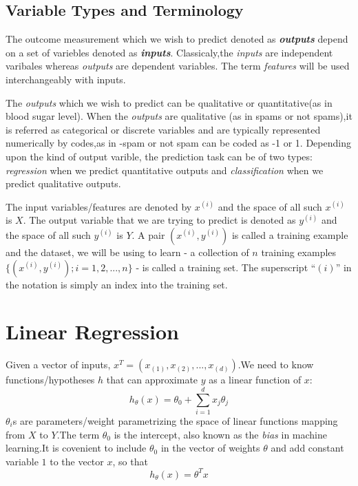 \documentclass[12pt]{article}
\begin{document}
\subsection*{Variable Types and Terminology}

The outcome measurement which we wish to predict denoted as \textbf{\textit{outputs}} depend on a set of variebles denoted as \textbf{\textit{inputs}}.
Classicaly,the \textit{inputs} are independent varibales whereas \textit{outputs} are dependent variables.
The term \textit{features} will be used interchangeably with inputs.

The \textit{outputs} which we wish to predict can be qualitative or quantitative(as in blood sugar level).
When the \textit{outputs} are qualitative (as in spams or  not spams),it is referred as categorical or discrete variables and are typically represented numerically by codes,as in -spam or not spam can be coded as -1 or 1.
Depending upon the kind of output varible, the prediction task can be of two types: \textit{regression} when we predict quantitative outputs and \textit{classification} when we predict  qualitative outputs.




 The input variables/features are denoted by $x^{(i)}$ and  the space of all such $x^{(i)}$ is $X$.
 The output variable that we are trying to predict is denoted as $y^{(i)}$ and the space of all such $y^{(i)}$ is $Y$.
 A pair $(x^{(i)},y^{(i)})$ is called a training example and the dataset, we will be using to learn - a collection of $n$ training examples $ \{(x^{(i)},y^{(i)});i=1,2,...,n\} $ - is called a training set.
 The superscript $“(i)”$ in the notation is simply an index into the training set.


\cleardoublepage

\section*{Linear Regression}

Given a vector of inputs, $x^{T}=(x_{(1)},x_{(2)},..., x_{(d)})$.We need to know functions/hypotheses $h$ that can  approximate $y$ as a linear function of $x$: $$ h_{\theta}(x)=\theta_{0} + \sum_{i=1}^{d}x_{j}\theta_{j}$$
$\theta_{i}$s are parameters/weight parametrizing the space of linear functions mapping from $X$ to $Y$.The term $\theta_{0}$ is the intercept, also known as the \textit{bias} in machine learning.It is covenient to include $\theta_{0}$ in the vector of weights $\theta$  and add constant variable $1$ to the vector $x$, so that $$ h_{\theta}(x) = \theta^{T}x$$
\end{document}
